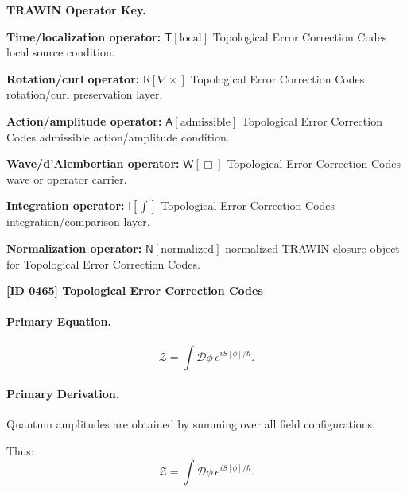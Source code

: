 \par\vspace{0.45\baselineskip}
\noindent\begin{minipage}[t]{\linewidth}
\begingroup
\small
\raggedright
\textbf{TRAWIN Operator Key.}\par
\noindent\textbf{Time/localization operator:} $\mathsf{T}\!\left[\mathrm{local}\right]$ Topological Error Correction Codes local source condition.\par
\noindent\textbf{Rotation/curl operator:} $\mathsf{R}\!\left[\nabla\times\right]$ Topological Error Correction Codes rotation/curl preservation layer.\par
\noindent\textbf{Action/amplitude operator:} $\mathsf{A}\!\left[\mathrm{admissible}\right]$ Topological Error Correction Codes admissible action/amplitude condition.\par
\noindent\textbf{Wave/d'Alembertian operator:} $\mathsf{W}\!\left[\Box\right]$ Topological Error Correction Codes wave or operator carrier.\par
\noindent\textbf{Integration operator:} $\mathsf{I}\!\left[\int\right]$ Topological Error Correction Codes integration/comparison layer.\par
\noindent\textbf{Normalization operator:} $\mathsf{N}\!\left[\mathrm{normalized}\right]$ normalized TRAWIN closure object for Topological Error Correction Codes.\par
\endgroup
\end{minipage}

\clearpage
\noindent\textbf{[ID 0465] Topological Error Correction Codes}\par
\vspace{0.35em}
\paragraph{Primary Equation.}
\begin{equation}
\mathcal{Z}
=
\int \mathcal{D}\phi \, e^{iS[\phi]/\hbar}.
\end{equation}

\paragraph{Primary Derivation.}
Quantum amplitudes are obtained by summing over all field configurations.

Thus:
\begin{equation}
\boxed{
\mathcal{Z}
=
\int \mathcal{D}\phi \, e^{iS[\phi]/\hbar}.
}
\end{equation}

